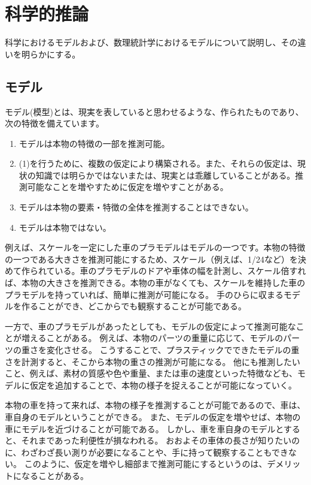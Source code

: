 \chapter{科学的推論}
科学におけるモデルおよび、数理統計学におけるモデルについて説明し、その違いを明らかにする。


\section{モデル}
モデル(模型)とは、現実を表していると思わせるような、作られたものであり、次の特徴を備えています。
\begin{enumerate}
    \item モデルは本物の特徴の一部を推測可能。
    \item (1)を行うために、複数の仮定により構築される。また、それらの仮定は、現状の知識では明らかではないまたは、現実とは乖離していることがある。推測可能なことを増やすために仮定を増やすことがある。
    \item モデルは本物の要素・特徴の全体を推測することはできない。
    \item モデルは本物ではない。
\end{enumerate}
  
例えば、スケールを一定にした車のプラモデルはモデルの一つです。本物の特徴の一つである大きさを推測可能にするため、スケール（例えば、1/24など）を決めて作られている。車のプラモデルのドアや車体の幅を計測し、スケール倍すれば、本物の大きさを推測できる。本物の車がなくても、スケールを維持した車のプラモデルを持っていれば、簡単に推測が可能になる。
手のひらに収まるモデルを作ることができ、どこからでも観察することが可能である。

一方で、車のプラモデルがあったとしても、モデルの仮定によって推測可能なことが増えることがある。
例えば、本物のパーツの重量に応じて、モデルのパーツの重さを変化させる。
こうすることで、プラスティックでできたモデルの重さを計測すると、そこから本物の重さの推測が可能になる。
他にも推測したいこと、例えば、素材の質感や色や重量、または車の速度といった特徴なども、モデルに仮定を追加することで、本物の様子を捉えることが可能になっていく。


本物の車を持って来れば、本物の様子を推測することが可能であるので、車は、車自身のモデルということができる。
また、モデルの仮定を増やせば、本物の車にモデルを近づけることが可能である。
しかし、車を車自身のモデルとすると、それまであった利便性が損なわれる。
おおよその車体の長さが知りたいのに、わざわざ長い測りが必要になることや、手に持って観察することもできない。
このように、仮定を増やし細部まで推測可能にするというのは、デメリットになることがある。

